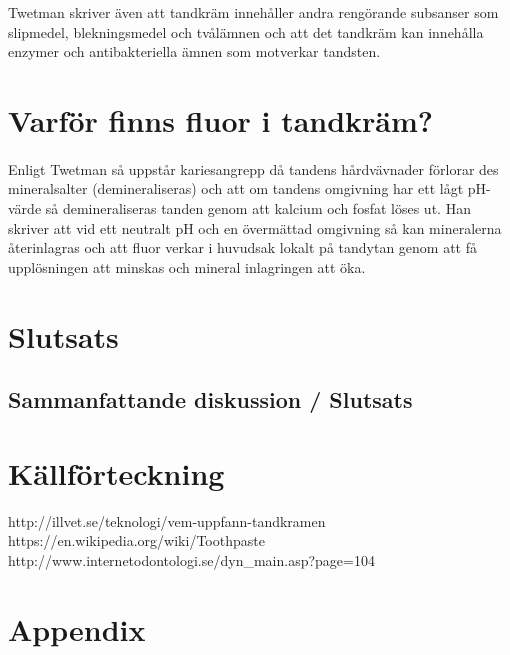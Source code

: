 \documentclass[12pt]{article}
\begin{document}
		Twetman skriver även att tandkräm innehåller andra rengörande subsanser som slipmedel, blekningsmedel och tvålämnen och att det tandkräm kan innehålla enzymer och antibakteriella ämnen som motverkar tandsten.

	\section{Varför finns fluor i tandkräm?}
		\paragraph{}Enligt Twetman så uppstår kariesangrepp då tandens hårdvävnader förlorar des mineralsalter (demineraliseras) och att om tandens omgivning har ett lågt pH-värde så demineraliseras tanden genom att kalcium och fosfat löses ut. Han skriver att vid ett neutralt pH och en övermättad omgivning så kan mineralerna återinlagras och att fluor verkar i huvudsak lokalt på tandytan genom att få upplösningen att minskas och mineral inlagringen att öka. 

	\section{Slutsats}
		\subsection{Sammanfattande diskussion / Slutsats}

	\newpage
	\section{Källförteckning}
	http://illvet.se/teknologi/vem-uppfann-tandkramen\\
	https://en.wikipedia.org/wiki/Toothpaste\\
	http://www.internetodontologi.se/dyn\_main.asp?page=104\\
	\newpage
	\section{Appendix}
\end{document}
